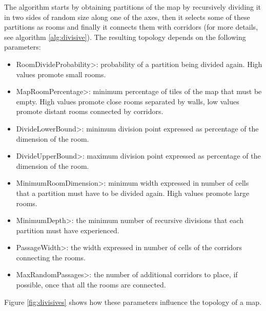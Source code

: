 \par

The algorithm starts by obtaining partitions of the map by recursively dividing it in two sides of random size along one of the axes, then it selects some of these partitions as rooms and finally it connects them with corridors (for more details, see algorithm \ref{alg:divisive}). The resulting topology depends on the following parameters:

\begin{itemize}
\item \<RoomDivideProbability>: probability of a partition being divided again. High values promote small rooms.
\item \<MapRoomPercentage>: minimum percentage of tiles of the map that must be empty. High values promote close rooms separated by walls, low values promote distant rooms connected by corridors.
\item \<DivideLowerBound>: minimum division point expressed as percentage of the dimension of the room.
\item \<DivideUpperBound>: maximum division point expressed as percentage of the dimension of the room.
\item \<MinimumRoomDimension>: minimum width expressed in number of cells that a partition must have to be divided again. High values promote large rooms.
\item \<MinimumDepth>: the minimum number of recursive divisions that each partition must have experienced.
\item \<PassageWidth>: the width expressed in number of cells of the corridors connecting the rooms.
\item \<MaxRandomPassages>: the number of additional corridors to place, if possible, once that all the rooms are connected.
\end{itemize}

Figure \ref{fig:divisives} shows how these parameters influence the topology of a map.


